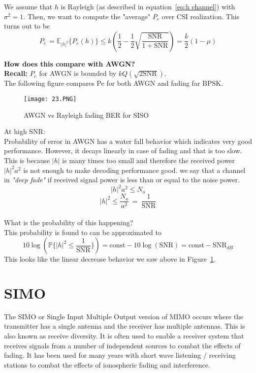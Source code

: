 We assume that $h$ is Rayleigh (as described in equation~\ref{eq:h channel}) with $\sigma^2= 1$.
Then, we want to compute the "average" $P_e$ over CSI realization. This turns out to be
\begin{equation}
    \label{eq:avg Pe for SISO}
    P_{e\ }=\mathbb{E}_{\left|h\right|^2}\{P_e\left(h\right)\} \le k \left(\frac{1}{2}-\frac{1}{2}\sqrt{\frac{\text{SNR}}{1+\text{SNR}}}\right) =\frac{k}{2}\left(1-\mu\right)
\end{equation}

\textbf{How does this compare with AWGN?} \\
\textbf{Recall:} $P_e$ for AWGN is bounded by $k Q(\sqrt{2\text{SNR}})$. \\
The following figure compares Pe for both AWGN and fading far BPSK.
\begin{figure}[h]
    \centering
    \texttt{[image: 23.PNG]}
    \caption{AWGN vs Rayleigh fading BER for SISO}
    \label{fig:BER SISO}
\end{figure}

At high SNR: \\
Probability of error in AWGN has a water fall behavior which indicates very good performance.
However, it decays linearly in case of fading and that is too slow.
This is because $|h|$ is many times too small and therefore the received power $|h|^2 a^2$ is not enough to make decoding performance good.
we say that a channel in \emph{"deep fade"} if received signal power is less than or equal to the noise power. \\
\[\left|h\right|^2a^2\le N_o\]
\[|h|^2\le \frac{N_o}{a^2}\ =\ \frac{1}{\text{SNR}}\] \\
What is the probability of this happening? \\
This probability is found to can be approximated to 
\begin{equation}
    \label{eq:SISO Pe}
    10\log\left(\mathbb{P}\{|h|^2\le \frac{1}{\text{SNR}}\} \right)= \text{const}-10\log\left(\text{SNR}\right)=\text{const}-\text{SNR}_{dB}
\end{equation}
This looks like the linear decrease behavior we saw above in Figure~\ref{fig:BER SISO}.

\section{SIMO}
The SIMO or Single Input Multiple Output version of MIMO occurs where the transmitter has a single antenna and the receiver has multiple antennas. This is also known as receive diversity. It is often used to enable a receiver system that receives signals from a number of independent sources to combat the effects of fading. It has been used for many years with short wave listening / receiving stations to combat the effects of ionospheric fading and interference.\\

